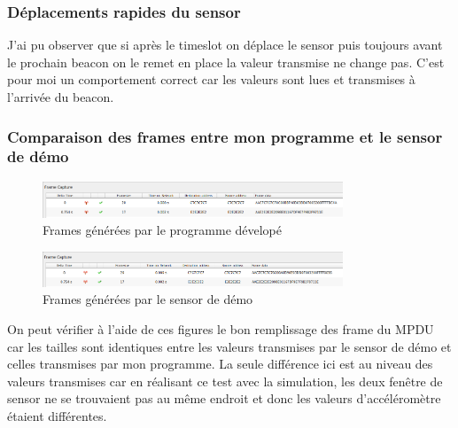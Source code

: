 \documentclass{report}
\begin{document}
\subsubsection{Déplacements rapides du sensor}
\label{subsubsection:FastMoves}
J'ai pu observer que si après le timeslot on déplace le sensor puis toujours avant le prochain beacon on le remet en place la valeur transmise ne change pas. C'est pour moi un comportement correct car les valeurs sont lues et transmises à l'arrivée du beacon.
\subsubsection{Comparaison des frames entre mon programme et le sensor de démo}
\label{subsubsection:Comparing}
\begin{figure}[H]
    \centering
    \includegraphics[width= 0.8\textwidth]{Images/OwnFrame.png}
    \caption{Frames générées par le programme dévelopé}
    \label{fig:OwnFrames}
\end{figure}
\begin{figure}[H]
    \centering
    \includegraphics[width= 0.8\textwidth]{Images/DemoFrames.png}
    \caption{Frames générées par le sensor de démo}
    \label{fig:DemoFrames}
\end{figure}
On peut vérifier à l'aide de ces figures le bon remplissage des frame du MPDU car les tailles sont identiques entre les valeurs transmises par le sensor de démo et celles transmises par mon programme. La seule différence ici est au niveau des valeurs transmises car en réalisant ce test avec la simulation, les deux fenêtre de sensor ne se trouvaient pas au même endroit et donc les valeurs d'accéléromètre étaient différentes.
\end{document}
